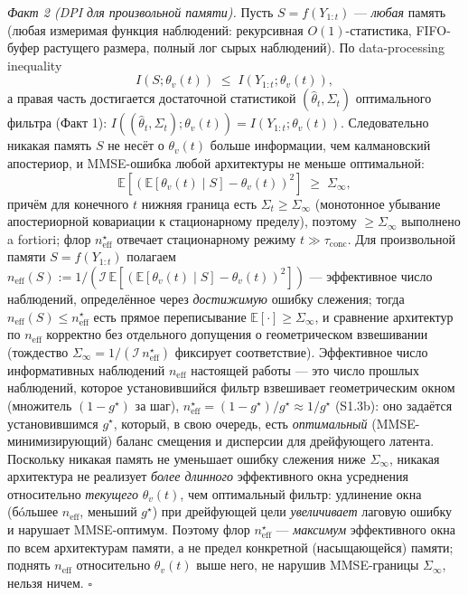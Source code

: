 \documentclass[12pt]{iopart}
\begin{document}
\emph{Факт 2 (DPI для произвольной памяти).} Пусть \(S = f(Y_{1:t})\) --- \emph{любая} память (любая измеримая функция наблюдений: рекурсивная \(O(1)\)-статистика, FIFO-буфер растущего размера, полный лог сырых наблюдений). По data-processing inequality \[I(S;\theta_v(t)) \;\le\; I(Y_{1:t};\theta_v(t)),\] а правая часть достигается достаточной статистикой \((\hat\theta_t,\Sigma_t)\) оптимального фильтра (Факт 1): \(I((\hat\theta_t,\Sigma_t);\theta_v(t)) = I(Y_{1:t};\theta_v(t))\). Следовательно никакая память \(S\) не несёт о \(\theta_v(t)\) больше информации, чем калмановский апостериор, и MMSE-ошибка любой архитектуры не меньше оптимальной: \[\mathbb E[(\mathbb E[\theta_v(t)\mid S]-\theta_v(t))^2] \;\ge\; \Sigma_\infty,\] причём для конечного \(t\) нижняя граница есть \(\Sigma_t\ge\Sigma_\infty\) (монотонное убывание апостериорной ковариации к стационарному пределу), поэтому \(\ge\Sigma_\infty\) выполнено a fortiori; флор \(n_{\text{eff}}^\star\) отвечает стационарному режиму \(t\gg\tau_{\text{conc}}\). Для произвольной памяти \(S=f(Y_{1:t})\) полагаем \(n_{\text{eff}}(S):=1/(\mathcal I\,\mathbb E[(\mathbb E[\theta_v(t)\mid S]-\theta_v(t))^2])\) --- эффективное число наблюдений, определённое через \emph{достижимую} ошибку слежения; тогда \(n_{\text{eff}}(S)\le n_{\text{eff}}^\star\) есть прямое переписывание \(\mathbb E[\cdot]\ge\Sigma_\infty\), и сравнение архитектур по \(n_{\text{eff}}\) корректно без отдельного допущения о геометрическом взвешивании (тождество \(\Sigma_\infty=1/(\mathcal I\,n_{\text{eff}}^\star)\) фиксирует соответствие). Эффективное число информативных наблюдений \(n_{\text{eff}}\) настоящей работы --- это число прошлых наблюдений, которое установившийся фильтр взвешивает геометрическим окном (множитель \((1-g^\star)\) за шаг), \(n_{\text{eff}}^\star = (1-g^\star)/g^\star \approx 1/g^\star\) (S1.3b): оно задаётся установившимся \(g^\star\), который, в свою очередь, есть \emph{оптимальный} (MMSE-минимизирующий) баланс смещения и дисперсии для дрейфующего латента. Поскольку никакая память не уменьшает ошибку слежения ниже \(\Sigma_\infty\), никакая архитектура не реализует \emph{более длинного} эффективного окна усреднения относительно \emph{текущего} \(\theta_v(t)\), чем оптимальный фильтр: удлинение окна (бóльшее \(n_{\text{eff}}\), меньший \(g^\star\)) при дрейфующей цели \emph{увеличивает} лаговую ошибку и нарушает MMSE-оптимум. Поэтому флор \(n_{\text{eff}}^\star\) --- \emph{максимум} эффективного окна по всем архитектурам памяти, а не предел конкретной (насыщающейся) памяти; поднять \(n_{\text{eff}}\) относительно \(\theta_v(t)\) выше него, не нарушив MMSE-границы \(\Sigma_\infty\), нельзя ничем. \(\square\)
\end{document}
